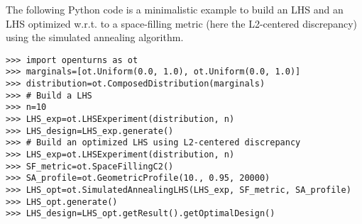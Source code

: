 \begin{otexample}
    The following Python code is a minimalistic \ot example to build an LHS and 
    an LHS optimized w.r.t. to a space-filling metric (here the L2-centered discrepancy) using the simulated annealing algorithm. 
    \lstset{style=mystyle, language=python}
%
\begin{lstlisting}
>>> import openturns as ot
>>> marginals=[ot.Uniform(0.0, 1.0), ot.Uniform(0.0, 1.0)]
>>> distribution=ot.ComposedDistribution(marginals)
>>> # Build a LHS
>>> n=10
>>> LHS_exp=ot.LHSExperiment(distribution, n)
>>> LHS_design=LHS_exp.generate()
>>> # Build an optimized LHS using L2-centered discrepancy
>>> LHS_exp=ot.LHSExperiment(distribution, n)
>>> SF_metric=ot.SpaceFillingC2()
>>> SA_profile=ot.GeometricProfile(10., 0.95, 20000)
>>> LHS_opt=ot.SimulatedAnnealingLHS(LHS_exp, SF_metric, SA_profile)
>>> LHS_opt.generate()
>>> LHS_design=LHS_opt.getResult().getOptimalDesign()
\end{lstlisting}
%
\end{otexample}


